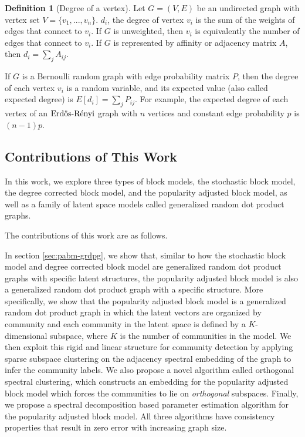 \documentclass[
  12pt,
]{article}
\theoremstyle{definition}
\newtheorem{definition}{Definition}[section]
\theoremstyle{definition}
\theoremstyle{definition}
\theoremstyle{definition}
\theoremstyle{remark}
\begin{document}
\begin{definition}[Degree of a vertex]
\label{def:degree}
Let $G = (V, E)$ be an undirected graph with vertex set $V = \{v_1, ..., v_n\}$. 
$d_i$, the degree of vertex $v_i$ is the sum of the weights of edges that connect to $v_i$. 
If $G$ is unweighted, then $v_i$ is equivalently the number of edges that connect to $v_i$. 
If $G$ is represented by affinity or adjacency matrix $A$, then $d_i = \sum_j A_{ij}$. 

If $G$ is a Bernoulli random graph with edge probability matrix $P$, then the degree of each vertex $v_i$ is a random variable, and its expected value (also called expected degree) is $E[d_i] = \sum_j P_{ij}$. 
For example, the expected degree of each vertex of an $\text{Erd\"{o}s-R\'{e}nyi}$ graph with $n$ vertices and constant edge probability $p$ is $(n - 1) p$. 
\end{definition}

\hypertarget{contributions-of-this-work}{%
\subsection{Contributions of This Work}\label{contributions-of-this-work}}

In this work, we explore three types of block models, the stochastic block model, the degree corrected block model, and the popularity adjusted block model, as well as a family of latent space models called generalized random dot product graphs.

The contributions of this work are as follows.

In section \ref{sec:pabm-grdpg}, we show that, similar to how the stochastic block model and degree corrected block model are generalized random dot product graphs with specific latent structures, the popularity adjusted block model is also a generalized random dot product graph with a specific structure.
More specifically, we show that the popularity adjusted block model is a generalized random dot product graph in which the latent vectors are organized by community and each community in the latent space is defined by a \(K\)-dimensional subspace, where \(K\) is the number of communities in the model.
We then exploit this rigid and linear structure for community detection by applying sparse subspace clustering on the adjacency spectral embedding of the graph to infer the community labels.
We also propose a novel algorithm called orthogonal spectral clustering, which constructs an embedding for the popularity adjusted block model which forces the communities to lie on \emph{orthogonal} subspaces.
Finally, we propose a spectral decomposition based parameter estimation algorithm for the popularity adjusted block model.
All three algorithms have consistency properties that result in zero error with increasing graph size.
\end{document}
